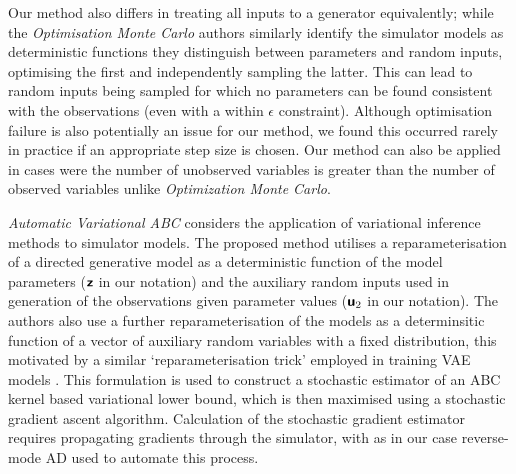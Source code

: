 Our method also differs in treating all inputs to a generator equivalently; while the \emph{Optimisation Monte Carlo} authors similarly identify the simulator models as deterministic functions they distinguish between parameters and random inputs, optimising the first and independently sampling the latter. This can lead to random inputs being sampled for which no parameters can be found consistent with the observations (even with a within $\epsilon$ constraint). Although optimisation failure is also potentially an issue for our method, we found this occurred rarely in practice if an appropriate step size is chosen. Our method can also be applied in cases were the number of unobserved variables is greater than the number of observed variables unlike \emph{Optimization Monte Carlo}.


\emph{Automatic Variational ABC} \citep{moreno2016automatic} considers the application of variational inference methods to simulator models. The proposed method utilises a reparameterisation of a directed generative model as a deterministic function of the model parameters ($\boldsymbol{\mathsf{z}}$ in our notation) and the auxiliary random inputs used in generation of the observations given parameter values ($\boldsymbol{\mathsf{u}}_2$ in our notation). The authors also use a further reparameterisation of the models as a determinsitic function of a vector of auxiliary random variables with a fixed distribution, this motivated by a similar `reparameterisation trick' employed in training \ac{VAE} models \citep{kingma2013auto}. This formulation is used to construct a stochastic estimator of an \ac{ABC} kernel based variational lower bound, which is then maximised using a stochastic gradient ascent algorithm. Calculation of the stochastic gradient estimator requires propagating gradients through the simulator, with as in our case reverse-mode \ac{AD} used to automate this process. %

